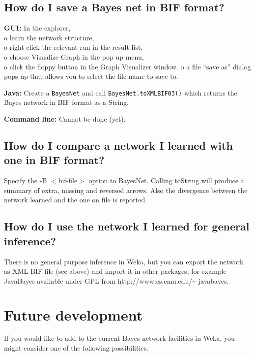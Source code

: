 \documentclass{article}
\begin{document}
\subsection*{How do I save a Bayes net in BIF format?}
{\bf GUI:} In the explorer,\\
o learn the network structure,\\
o right click the relevant run in the result list,\\
o choose Visualize Graph in the pop up menu,\\
o click the floppy button in the Graph Visualizer window.
o a file ``save as'' dialog pops up that allows you to select the file name to save to.

{\bf Java:} Create a {\tt BayesNet} and call {\tt BayesNet.toXMLBIF03()}
which returns the Bayes network in BIF format as a String.

{\bf Command line:} Cannot be done (yet).

\subsection*{How do I compare a network I learned with one in BIF format?}
Specify the -B $<$bif-file$>$ option to BayesNet. 
Calling toString will produce a summary of extra, missing and reversed arrows.
Also the divergence between the network learned and the one on file is reported.

\subsection*{How do I use the network I learned for general inference?}
There is no general purpose inference in Weka, but you can export the
network as XML BIF file (see above) and import it in other packages,
for example JavaBayes available under GPL from
http://www.cs.cmu.edu/\~{} javabayes.


\section{Future development}

If you would like to add to the current Bayes network facilities in Weka, you might
consider one of the following possibilities.
\end{document}
